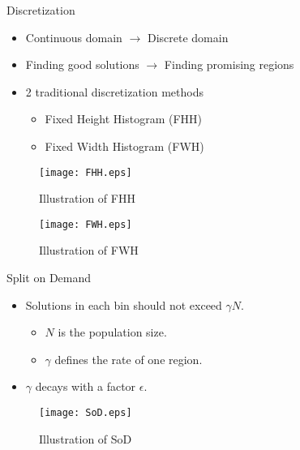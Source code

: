 \begin{frame}{Discretization} 
  \begin{itemize} 
    \item Continuous domain $\rightarrow$ Discrete domain 
    \item Finding good solutions $\rightarrow$ Finding promising
      regions
    \item 2 traditional discretization methods
      \begin{itemize}
        \item Fixed Height Histogram (FHH)
        \item Fixed Width Histogram (FWH)
      \end{itemize}
      \vspace*{2pt}
  \end{itemize}
  \begin{minipage}{.45\textwidth}
    \begin{figure}
      \centering
      \texttt{[image: FHH.eps]}
      \caption{Illustration of FHH}
    \end{figure}
  \end{minipage}
  \begin{minipage}{.45\textwidth}
    \begin{figure}
      \centering
      \texttt{[image: FWH.eps]}
      \caption{Illustration of FWH}
    \end{figure}
  \end{minipage}

\end{frame}

\begin{frame}{Split on Demand}
  \begin{itemize}
    \item Solutions in each bin should not exceed $\gamma N$.
      \begin{itemize}
        \item $N$ is the population size.
        \item $\gamma$ defines the rate of one region.
      \end{itemize}
    \item $\gamma$ decays with a factor $\epsilon$.
  \end{itemize}
  \hspace{-9cm}
  \vspace*{-0.5cm}
  \begin{figure}[h]
    \texttt{[image: SoD.eps]}
    \caption{Illustration of SoD}
  \end{figure}
\end{frame}

